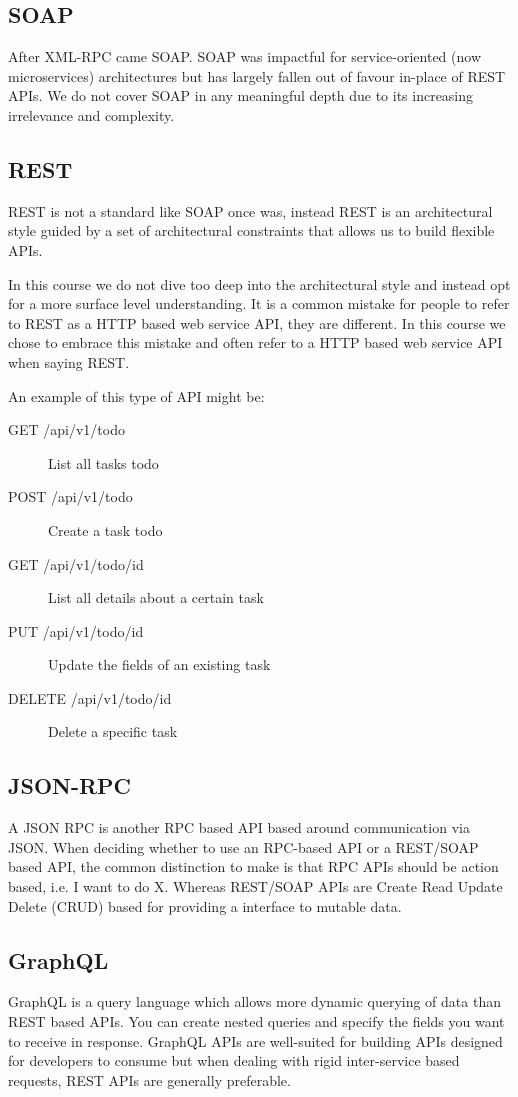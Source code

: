 \documentclass{csse4400}
\begin{document}
\subsection{SOAP}
After XML-RPC came SOAP.
SOAP was impactful for service-oriented (now microservices) architectures but has largely fallen out of favour in-place of REST APIs.
We do not cover SOAP in any meaningful depth due to its increasing irrelevance and complexity.

\subsection{REST}
REST is not a standard like SOAP once was,
instead REST is an architectural style guided by a set of architectural constraints that allows us to build flexible APIs.

In this course we do not dive too deep into the architectural style and instead opt for a more surface level understanding.
It is a common mistake for people to refer to REST as a HTTP based web service API,
they are different.
In this course we chose to embrace this mistake and often refer to a HTTP based web service API when saying REST.

\noindent An example of this type of API might be:
\begin{description}
  \item[GET /api/v1/todo] List all tasks todo
  \item[POST /api/v1/todo] Create a task todo
  \item[GET /api/v1/todo/{id}] List all details about a certain task
  \item[PUT /api/v1/todo/{id}] Update the fields of an existing task
  \item[DELETE /api/v1/todo/{id}] Delete a specific task
\end{description}

\subsection{JSON-RPC}
A JSON RPC is another RPC based API based around communication via JSON.
When deciding whether to use an RPC-based API or a REST/SOAP based API,
the common distinction to make is that RPC APIs should be action based, i.e. I want to do X.
Whereas REST/SOAP APIs are Create Read Update Delete (CRUD) based for providing a interface to mutable data.

\subsection{GraphQL}
GraphQL is a query language which allows more dynamic querying of data than REST based APIs.
You can create nested queries and specify the fields you want to receive in response.
GraphQL APIs are well-suited for building APIs designed for developers to consume but when dealing with rigid inter-service based requests,
REST APIs are generally preferable.
\end{document}
